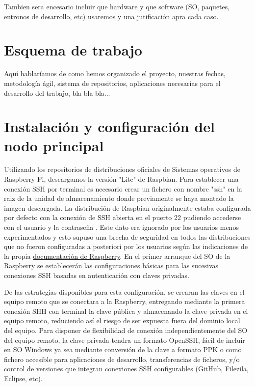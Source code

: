 Tambien sera encesario incluir que hardware y que software (SO, paquetes, entronos de desarrollo, etc) usaremos y una jutificación apra cada caso.


\section{Esquema de trabajo}
\label{makereference1.5}
Aquí hablaríamos de como hemos organizado el proyecto, nuestras fechas, metodología ágil, sistema de repositorios, aplicaciones necesarias para el desarrollo del trabajo, bla bla bla...

\section{Instalación y configuración del nodo principal}
\label{makereference1.6}
 Utilizando los repositorios de distribuciones oficiales de Sistemas operativos de Raspberry Pi, descargamos la versión "Lite" de Raspbian. Para establecer una conexión SSH por terminal es necesario crear un fichero con nombre "ssh" en la raiz de la unidad de almacenamiento donde previamente se haya montado la imagen descargada. La distribución de Raspbian originalmente estaba configurada por defecto con la conexión de SSH abierta en el puerto 22 pudiendo accederse con el usuario  y la contraseña . Este dato era ignorado por los usuarios menos experimentados y esto supuso una brecha de seguridad en todos las distribuciones que no fueron configuradas a posteriori por los usuarios según las indicaciones de la propia \href{https://www.raspberrypi.org/documentation/configuration/security.md}{ documentación de Raspberry}. En el primer arranque del SO de la Raspberry se establecerán las configuraciones básicas para las sucesivas conexiones SSH basadas en autenticación con claves privadas.

 De las estrategias disponibles para esta configuración, se crearan las claves en el equipo remoto que se conectara a la Raspberry, entregando mediante la primera conexión SHH con terminal la clave pública y almacenando la clave privada en el equipo remoto, reduciendo así el riesgo de ser expuesta fuera del dominio local del equipo. Para disponer de flexibilidad de conexión independientemente del SO del equipo remoto, la clave privada tendra un formato OpenSSH, fácil de incluir en SO Windows ya sea mediante conversión de la clave a formato PPK o como fichero accesible para aplicaciones de desarrollo, transferencias de ficheros, y/o control de versiones que integran conexiones SSH configurables (GitHub, Filezila, Eclipse, etc).

